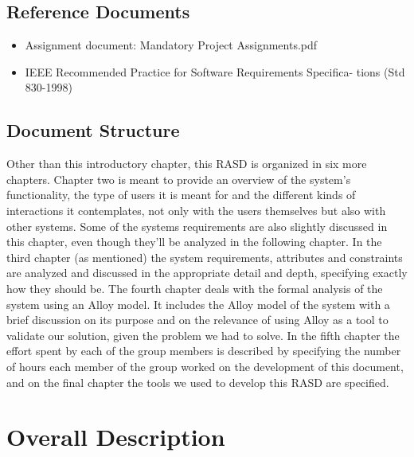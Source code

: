 \documentclass[12pt]{article}
\begin{document}
\subsection{Reference Documents}
    \begin{itemize}
        \item Assignment document: Mandatory Project Assignments.pdf
        \item IEEE Recommended Practice for Software Requirements Specifica- tions (Std 830-1998)
    \end{itemize}


\subsection{Document Structure}
Other than this introductory chapter, this RASD is organized in six more chapters. Chapter two is meant to provide an overview of the system's functionality, the type of users it is meant for and the different kinds of interactions it contemplates, not only with the users themselves but also with other systems. Some of the systems requirements are also slightly discussed in this chapter, even though they’ll be analyzed in the following chapter. In the third chapter (as mentioned) the system requirements, attributes and constraints are analyzed and discussed in the appropriate detail and depth, specifying exactly how they should be.
The fourth chapter deals with the formal analysis of the system using an Alloy model. It includes the Alloy model of the system with a brief discussion on its purpose and on the relevance of using Alloy as a tool to validate our solution, given the problem we had to solve.
In the fifth chapter the effort spent by each of the group members is described by specifying the number of hours each member of the group worked on the development of this document, and on the final chapter the tools we used to develop this RASD are specified.

\section{Overall Description}
\end{document}
